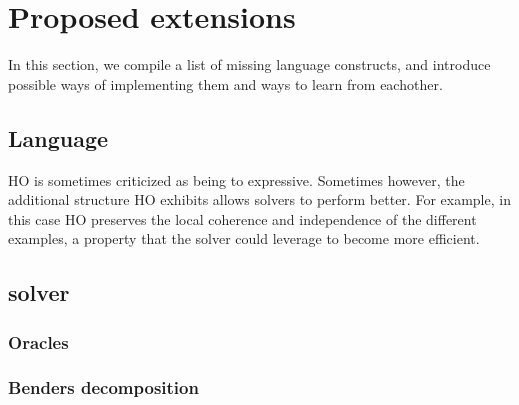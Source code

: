 \section{Proposed extensions}\label{sec:extension}
In this section, we compile a list of missing language constructs, and introduce possible ways of implementing them and ways to learn from eachother.
\subsection{Language}
HO is sometimes criticized as being to expressive.
Sometimes however, the additional structure HO exhibits allows solvers to perform better.
For example, in this case HO preserves the local coherence and independence of the different examples, a property that the solver could leverage to become more efficient.
\subsection{solver}

\subsubsection{Oracles}
\subsubsection{Benders decomposition}

